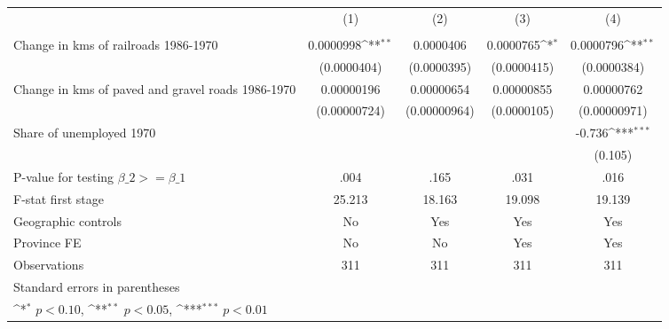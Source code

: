 {
\def\sym#1{\ifmmode^{#1}\else\(^{#1}\)\fi}
\begin{tabular}{l*{4}{c}}
\hline\hline
                &\multicolumn{1}{c}{(1)}&\multicolumn{1}{c}{(2)}&\multicolumn{1}{c}{(3)}&\multicolumn{1}{c}{(4)}\\
                &\multicolumn{1}{c}{}&\multicolumn{1}{c}{}&\multicolumn{1}{c}{}&\multicolumn{1}{c}{}\\
\hline
Change in kms of railroads 1986-1970&0.0000998\sym{**} &0.0000406         &0.0000765\sym{*}  &0.0000796\sym{**} \\
                &(0.0000404)         &(0.0000395)         &(0.0000415)         &(0.0000384)         \\
[1em]
Change in kms of paved and gravel roads 1986-1970&0.00000196         &0.00000654         &0.00000855         &0.00000762         \\
                &(0.00000724)         &(0.00000964)         &(0.0000105)         &(0.00000971)         \\
[1em]
Share of unemployed 1970&                  &                  &                  &   -0.736\sym{***}\\
                &                  &                  &                  &  (0.105)         \\
\hline
P-value for testing $\beta\_{2} >= \beta\_{1}$&     .004         &     .165         &     .031         &     .016         \\
F-stat first stage&   25.213         &   18.163         &   19.098         &   19.139         \\
Geographic controls&       No         &      Yes         &      Yes         &      Yes         \\
Province FE     &       No         &       No         &      Yes         &      Yes         \\
Observations    &      311         &      311         &      311         &      311         \\
\hline\hline
\multicolumn{5}{l}{\footnotesize Standard errors in parentheses}\\
\multicolumn{5}{l}{\footnotesize \sym{*} \(p<0.10\), \sym{**} \(p<0.05\), \sym{***} \(p<0.01\)}\\
\end{tabular}
}
